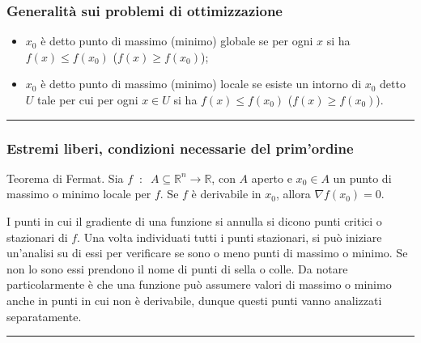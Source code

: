 \subsubsection*{Generalità sui problemi di ottimizzazione}
\begin{itemize}
    \item $x_0$ è detto punto di massimo (minimo) globale se per ogni $x$ si ha $f(x) \leq f(x_0)$ ($f(x) \geq f(x_0)$);
    \item $x_0$ è detto punto di massimo (minimo) locale se esiste un intorno di $x_0$ detto $U$ tale per cui per ogni $x \in U$ si ha $f(x) \leq f(x_0)$ ($f(x) \geq f(x_0)$).
\end{itemize}
\rule{\textwidth}{0.4pt}
\subsubsection*{Estremi liberi, condizioni necessarie del prim'ordine}
Teorema di Fermat. Sia $f \;\;:\;\; A \subseteq \mathbb{R}^n \rightarrow \mathbb{R}$, con $A$ aperto e $x_0 \in A$ un punto di massimo o minimo locale per $f$. Se $f$ è derivabile in $x_0$, allora $\nabla f(x_0) = 0$.\newline

I punti in cui il gradiente di una funzione si annulla si dicono punti critici o stazionari di $f$. Una volta individuati tutti i punti stazionari, si può iniziare un'analisi su di essi per verificare se sono o meno punti di massimo o minimo. Se non lo sono essi prendono il nome di punti di sella o colle. Da notare particolarmente è che una funzione può assumere valori di massimo o minimo anche in punti in cui non è derivabile, dunque questi punti vanno analizzati separatamente. \newline
\rule{\textwidth}{0.4pt}
